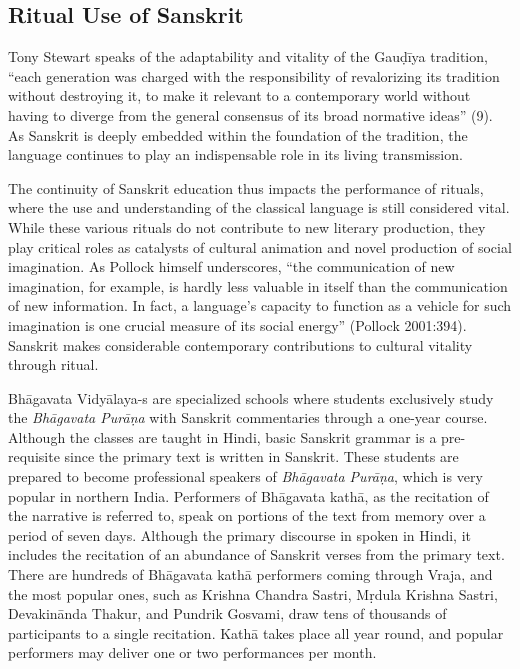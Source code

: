 \subsection*{Ritual Use of Sanskrit }
\vskip -5pt

Tony Stewart speaks of the adaptability and vitality of the Gauḍīya tradition, “each generation was charged with the responsibility of revalorizing its tradition without destroying it, to make it relevant to a contemporary world without having to diverge from the general consensus of its broad normative ideas” (9). As Sanskrit is deeply embedded within the foundation of the tradition, the language continues to play an indispensable role in its living transmission. 

The continuity of Sanskrit education thus impacts the performance of rituals, where the use and understanding of the classical language is still considered vital. While these various rituals do not contribute to new literary production, they play critical roles as catalysts of cultural animation and novel production of social imagination. As Pollock himself underscores, “the communication of new imagination, for example, is hardly less valuable in itself than the communication of new information. In fact, a language’s capacity to function as a vehicle for such imagination is one crucial measure of its social energy” (Pollock 2001:394). Sanskrit makes considerable contemporary contributions to cultural vitality through ritual. 

Bhāgavata Vidyālaya-s are specialized schools where students exclusively study the {\sl Bhāgavata Purāṇa} with Sanskrit commentaries through a one-year course. Although the classes are taught in Hindi, basic Sanskrit grammar is a pre-requisite since the primary text is written in Sanskrit. These students are prepared to become professional speakers of {\sl Bhāgavata Purāṇa}, which is very popular in northern India. Performers of Bhāgavata kathā, as the recitation of the narrative is referred to, speak on portions of the text from memory over a period of seven days. Although the primary discourse in spoken in Hindi, it includes the recitation of an abundance of Sanskrit verses from the primary text. There are hundreds of Bhāgavata kathā performers coming through Vraja, and the most popular ones, such as Krishna Chandra Sastri, Mṛdula Krishna Sastri, Devakinānda Thakur, and Pundrik Gosvami, draw tens of thousands of participants to a single recitation. Kathā takes place all year round, and popular performers may deliver one or two performances per month. 

